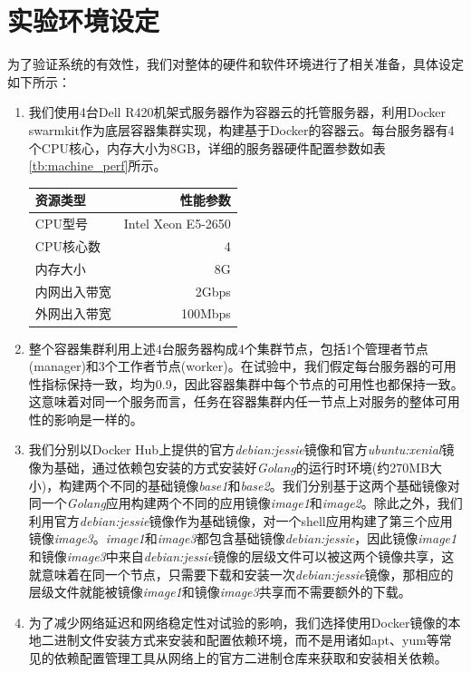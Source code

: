 \section{实验环境设定}\label{sec:env_prep}
为了验证系统的有效性，我们对整体的硬件和软件环境进行了相关准备，具体设定如下所示：
\begin{enumerate}
\item 我们使用4台Dell R420机架式服务器作为容器云的托管服务器，利用Docker swarmkit作为底层容器集群实现，构建基于Docker的容器云。每台服务器有4个CPU核心，内存大小为8GB，详细的服务器硬件配置参数如表\ref{tb:machine_perf}所示。
\begin{table}[h]
\centering
{}
\begin{tabular}{@{}lr@{}} \toprule
 资源类型 & 性能参数 \\ \midrule
 CPU型号 & Intel Xeon E5-2650\\
 CPU核心数 & 4\\
 内存大小 & 8G\\
 内网出入带宽 & 2Gbps\\
 外网出入带宽 & 100Mbps\\ \bottomrule
\end{tabular}
\end{table}
\item 整个容器集群利用上述4台服务器构成4个集群节点，包括1个管理者节点(manager)和3个工作者节点(worker)。在试验中，我们假定每台服务器的可用性指标保持一致，均为0.9，因此容器集群中每个节点的可用性也都保持一致。这意味着对同一个服务而言，任务在容器集群内任一节点上对服务的整体可用性的影响是一样的。
\item\label{req:serv_image} 我们分别以Docker Hub上提供的官方\emph{debian:jessie}镜像和官方\emph{ubuntu:xenial}镜像为基础，通过依赖包安装的方式安装好\emph{Golang}的运行时环境(约270MB大小)，构建两个不同的基础镜像\emph{base1}和\emph{base2}。我们分别基于这两个基础镜像对同一个\emph{Golang}应用构建两个不同的应用镜像\emph{image1}和\emph{image2}。除此之外，我们利用官方\emph{debian:jessie}镜像作为基础镜像，对一个shell应用构建了第三个应用镜像\emph{image3}。\emph{image1}和\emph{image3}都包含基础镜像\emph{debian:jessie}，因此镜像\emph{image1}和镜像\emph{image3}中来自\emph{debian:jessie}镜像的层级文件可以被这两个镜像共享，这就意味着在同一个节点，只需要下载和安装一次\emph{debian:jessie}镜像，那相应的层级文件就能被镜像\emph{image1}和镜像\emph{image3}共享而不需要额外的下载。
\item 为了减少网络延迟和网络稳定性对试验的影响，我们选择使用Docker镜像的本地二进制文件安装方式来安装和配置依赖环境，而不是用诸如apt、yum等常见的依赖配置管理工具从网络上的官方二进制仓库来获取和安装相关依赖。

\end{enumerate}
